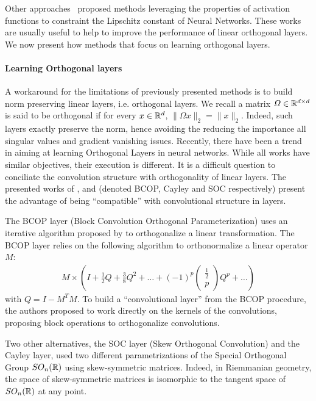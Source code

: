 Other approaches~\citep{anil2019sorting,singla2021householder,huang2021local} proposed methods leveraging the properties of activation functions to constraint the Lipschitz constant of Neural Networks. These works are usually useful to help  to improve the performance of linear orthogonal layers. We now present how methods that focus on learning orthogonal layers.



\paragraph{Learning Orthogonal layers} A workaround for the limitations of previously presented methods is to build norm preserving linear layers, i.e. orthogonal layers. We recall a matrix $\Omega\in\mathbb{R}^{d\times d}$ is said to be orthogonal if for every $x\in\mathbb{R}^d$, $\lVert\Omega x\rVert_2 = \lVert x\rVert_2$. Indeed, such layers exactly preserve the norm, hence avoiding the  reducing the importance all singular values and gradient vanishing issues. Recently, there have been a trend in aiming at learning Orthogonal Layers in neural networks.  While all works have similar objectives, their execution is different. It is a difficult question to conciliate the convolution structure with orthogonality of linear layers. The presented works of \citet{li2019preventing}, \citet{trockman2021orthogonalizing} and \citet{skew2021sahil} (denoted BCOP, Cayley and SOC respectively) present the advantage of being ``compatible''  with convolutional structure in layers. 

The BCOP layer (Block Convolution Orthogonal Parameterization) uses an iterative algorithm proposed by \citet{bjorck1971iterative} to orthogonalize a linear transformation. The BCOP layer relies on the following algorithm to orthonormalize a linear operator $M$:
\begin{align*}
 M\times\left(I+\frac12Q+\frac38Q^2+\dots+(-1)^p\begin{pmatrix} \frac12\\p \end{pmatrix}
Q^p+\dots \right)
\end{align*}
with $Q = I-M^TM$.
To build a ``convolutional layer'' from the BCOP procedure, the authors proposed to work directly on the kernels of the convolutions, proposing block operations to orthogonalize convolutions.

Two other alternatives, the SOC layer (Skew Orthogonal Convolution) and the Cayley layer, used two different parametrizations of the Special Orthogonal Group $SO_n(\mathbb{R})$ using skew-symmetric matrices. Indeed, in Riemmanian geometry, the space of skew-symmetric matrices is isomorphic to the tangent space of $SO_n(\mathbb{R})$ at any point. 

